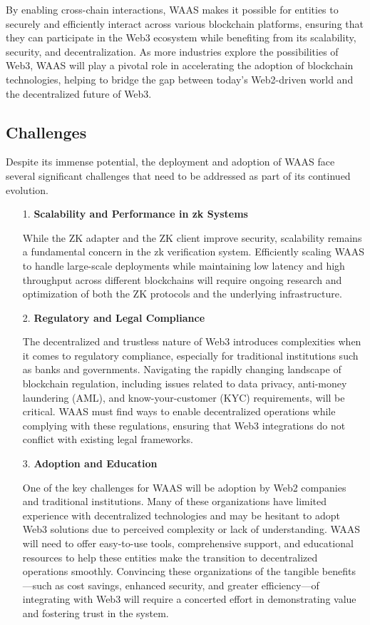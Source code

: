 By enabling cross-chain interactions, WAAS makes it possible for entities to securely and efficiently interact across various blockchain platforms, ensuring that they can participate in the Web3 ecosystem while benefiting from its scalability, security, and decentralization. As more industries explore the possibilities of Web3, WAAS will play a pivotal role in accelerating the adoption of blockchain technologies, helping to bridge the gap between today’s Web2-driven world and the decentralized future of Web3.

\subsection{Challenges}

Despite its immense potential, the deployment and adoption of WAAS face several significant challenges that need to be addressed as part of its continued evolution.

\begin{itemize}
    \item[1.] \textbf{Scalability and Performance in zk Systems}
    
   While the ZK adapter and the ZK client improve security, scalability remains a fundamental concern in the zk verification system.  Efficiently scaling WAAS to handle large-scale deployments while maintaining low latency and high throughput across different blockchains will require ongoing research and optimization of both the ZK protocols and the underlying infrastructure.

   \item[2.] \textbf{Regulatory and Legal Compliance}
   
   The decentralized and trustless nature of Web3 introduces complexities when it comes to regulatory compliance, especially for traditional institutions such as banks and governments. Navigating the rapidly changing landscape of blockchain regulation, including issues related to data privacy, anti-money laundering (AML), and know-your-customer (KYC) requirements, will be critical. WAAS must find ways to enable decentralized operations while complying with these regulations, ensuring that Web3 integrations do not conflict with existing legal frameworks.

    \item[3.] \textbf{Adoption and Education}
    
   One of the key challenges for WAAS will be adoption by Web2 companies and traditional institutions. Many of these organizations have limited experience with decentralized technologies and may be hesitant to adopt Web3 solutions due to perceived complexity or lack of understanding. WAAS will need to offer easy-to-use tools, comprehensive support, and educational resources to help these entities make the transition to decentralized operations smoothly. Convincing these organizations of the tangible benefits—such as cost savings, enhanced security, and greater efficiency—of integrating with Web3 will require a concerted effort in demonstrating value and fostering trust in the system.
\end{itemize}


